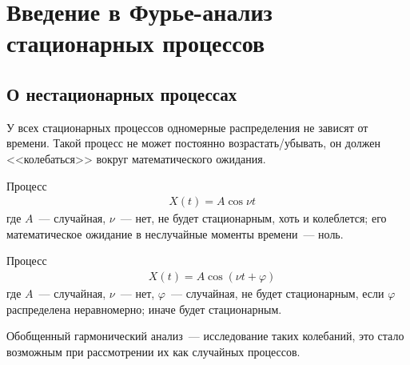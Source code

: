 \newpage
{}
\section{Введение в Фурье-анализ стационарных процессов}
\subsection{О нестационарных процессах}
У всех стационарных процессов одномерные распределения не зависят от времени. Такой процесс не может постоянно возрастать/убывать, он должен <<колебаться>> вокруг математического ожидания.
\begin{example}
    Процесс
    \begin{align*}
      & X(t) = A \cos \nu t
    \end{align*}
    где $A$~--- случайная, $\nu$~--- нет, не будет стационарным, хоть и колеблется; его математическое ожидание в неслучайные моменты времени~--- ноль.
\end{example}
\begin{example}
    Процесс
    \begin{align*}
      & X(t) = A \cos(\nu t +\varphi)
    \end{align*}
    где $A$~--- случайная, $\nu$~--- нет, $\varphi$~--- случайная, не будет
    стационарным, если $\varphi$ распределена неравномерно; иначе будет
    стационарным.
\end{example}
Обобщенный гармонический анализ~--- исследование таких колебаний, это стало
возможным при рассмотрении их как случайных процессов.
